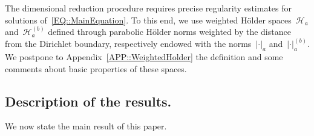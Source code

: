 \documentclass[12pt,a4paper]{amsart}
\numberwithin{equation}{section}
\theoremstyle{definition}
\theoremstyle{remark}
\newcommand{\abs}[1]{\left\lvert#1\right\rvert}
\begin{document}
The dimensional reduction procedure requires precise regularity estimates for solutions of~\eqref{EQ::MainEquation}. To this end, we use weighted Hölder spaces~$\mathcal{H}_a$ and~$\mathcal{H}_a^{(b)}$ defined through parabolic Hölder norms weighted by the distance from the Dirichlet boundary, respectively endowed with the norms~$\abs{\cdot}_a$ and~$\abs{\cdot}_a^{(b)}$. We postpone to Appendix~\ref{APP::WeightedHolder} the definition and some comments about basic properties of these spaces.

\subsection{Description of the results.}\label{SSEC::Results}

We now state the main result of this paper.
\end{document}
